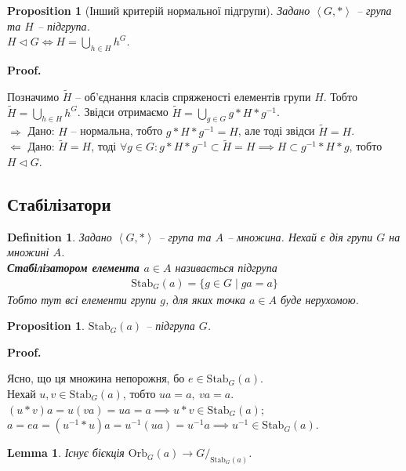 \documentclass[a4paper, 10pt]{article}
\makeatletter
\def\rightproof{$\boxed{\Rightarrow}$ }
\def\leftproof{$\boxed{\Leftarrow}$ }
\theoremstyle{theoremdd}
\theoremstyle{theoremdd}
\newtheorem{definition}[theorem]{Definition}
\theoremstyle{theoremdd}
\theoremstyle{theoremdd}
\theoremstyle{theoremdd}
\theoremstyle{theoremdd}
\theoremstyle{theoremdd}
\theoremstyle{theoremdd}
\theoremstyle{theoremdd}
\newtheorem{proposition}[theorem]{Proposition}
\theoremstyle{theoremdd}
\theoremstyle{theoremdd}
\theoremstyle{theoremdd}
\theoremstyle{theoremdd}
\newtheorem{lemma}[theorem]{Lemma}
\theoremstyle{theoremdd}
\theoremstyle{theoremdd}
\renewenvironment{proof}[1][Proof.\\]{\par
\pushQED{\hfill \qed}%
\normalfont \topsep6\p@\@plus6\p@\relax
\trivlist
\item\relax
{\bfseries
#1\@addpunct{.}}\hspace\labelsep\ignorespaces
}{%
\popQED\endtrivlist\@endpefalse
}
\newcommand\Orb{\text{Orb}}
\newcommand\Stab{\text{Stab}}
\makeatother
\begin{document}
\begin{proposition}[Інший критерій нормальної підгрупи]
Задано $\left< G,* \right>$ -- група та $H$ -- підгрупа.\\
$H \triangleleft G \iff H = \displaystyle\bigcup_{h \in H} h^G$.
\end{proposition}

\begin{proof}
Позначимо $\tilde{H}$ -- об'єднання класів спряженості елементів групи $H$. Тобто $\tilde{H} = \displaystyle\bigcup_{h \in H} h^G$. Звідси отримаємо $\tilde{H} = \displaystyle\bigcup_{g \in G} g*H*g^{-1}$.\\
\rightproof Дано: $H$ -- нормальна, тобто $g*H*g^{-1} = H$, але тоді звідси $\tilde{H} = H$.\\
\leftproof Дано: $\tilde{H} = H$, тоді $\forall g \in G: g*H*g^{-1} \subset \tilde{H} = H \implies H \subset g^{-1}*H*g$, тобто $H \triangleleft G$.
\end{proof}

\subsection{Стабілізатори}
\begin{definition}
Задано $\left< G,* \right>$ -- група та $A$ -- множина. Нехай є дія групи $G$ на множині $A$.\\
\textbf{Стабілізатором елемента $a \in A$} називається підгрупа
\begin{align*}
\Stab_G(a) = \{g \in G \mid ga = a\}
\end{align*}
Тобто тут всі елементи групи $g$, для яких точка $a \in A$ буде нерухомою.
\end{definition}

\begin{proposition}
$\Stab_G(a)$ -- підгрупа $G$.
\end{proposition}

\begin{proof}
Ясно, що ця множина непорожня, бо $e \in \Stab_G(a)$.\\
Нехай $u,v \in \Stab_G(a)$, тобто $ua = a,\ va = a$.\\
$(u*v)a = u(va) = ua = a \implies u*v \in \Stab_G(a)$;\\
$a = ea = (u^{-1}*u)a = u^{-1}(ua) = u^{-1}a \implies u^{-1} \in \Stab_G(a)$.
\end{proof}

\begin{lemma}
Існує бієкція $\Orb_G(a) \to G/_{\Stab_G(a)}$.
\end{lemma}
\end{document}
